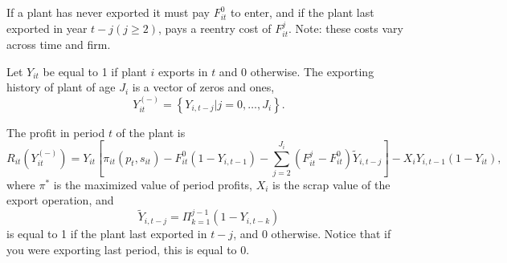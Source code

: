 \documentclass[11pt, pdftex]{article}
\begin{document}
If a plant has never exported it must pay $F^0_{it}$ to enter, and if the plant last exported in year $t-j (j\geq 2)$, pays a reentry cost of $F^j_{it}$. Note: these costs vary across time and firm.

Let $Y_{it}$ be equal to 1 if plant $i$ exports in $t$ and 0 otherwise.  The exporting history of plant of age $J_i$ is a vector of zeros and ones,
\begin{equation}
    Y_{it}^{(-)} = \left\{ Y_{i,t-j} \vert j=0,\dots,J_i\right\}.
\end{equation}



The profit in period $t$ of the plant is
\begin{equation}
    R_{it}\left( Y_{it}^{(-)} \right) = Y_{it}\left[ \pi_{it}\left( p_t, s_{it} \right)-F_{it}^0\left(1-Y_{i,t-1} \right)-\sum_{j=2}^{J_i}\left(F_{it}^j - F_{it}^0 \right)\widetilde{Y}_{i,t-j} \right] -X_iY_{i,t-1}\left(1-Y_{it} \right),
\end{equation}
where $\pi^*$ is the maximized value of period profits, $X_i$ is the scrap value of the export operation, and
\begin{equation}
    \widetilde{Y}_{i,t-j}=\Pi_{k=1}^{j-1}\left(1-Y_{i,t-k} \right)
\end{equation}
is equal to 1 if the plant last exported in $t-j$, and 0 otherwise. Notice that if you were exporting last period, this is equal to 0.
\end{document}
